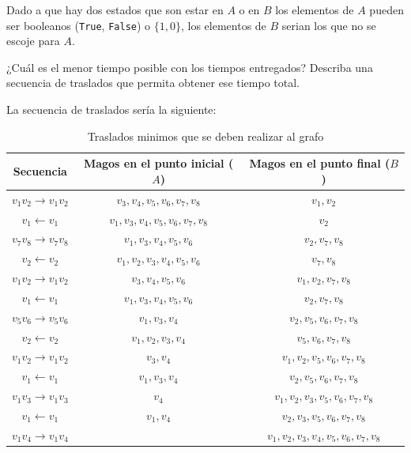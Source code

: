 \documentclass[letterpaper,10pt,table, dvipsnames]{article}
\begin{document}
Dado a que hay dos estados que son estar en $A$ o en $B$ los elementos de $A$ pueden ser booleanos (\texttt{True}, \texttt{False}) o $\{1,0\}$, los elementos de $B$ serian los que no se escoje para $A$.

\newpage

\begin{tcolorbox}
 ¿Cuál es el menor tiempo posible con los tiempos entregados? Describa una secuencia de traslados que permita obtener ese tiempo total.
\end{tcolorbox}

La secuencia de traslados sería la siguiente: 

\begin{table}[htbp]
  \centering
  \caption{Traslados minimos que se deben realizar al grafo}
\begin{tabular}{|c||c||c|}\hline
Secuencia & Magos en el punto inicial ($A$) & Magos en el punto final ($B$) \\\hline 
    $v_1v_2 \rightarrow v_1v_2$ & $v_3,v_4,v_5,v_6,v_7,v_8$     & $v_1,v_2$ \\\hline
  $  v_1 \leftarrow v_1$        & $v_1,v_3,v_4,v_5,v_6,v_7,v_8$ & $v_2$ \\\hline
    $v_7v_8 \rightarrow v_7v_8$ & $v_1,v_3,v_4,v_5,v_6$         & $v_2,v_7,v_8$ \\\hline
  $  v_2 \leftarrow v_2 $       & $v_1,v_2,v_3,v_4,v_5,v_6$     & $v_7,v_8$ \\\hline
    $v_1v_2 \rightarrow v_1v_2$ & $v_3,v_4,v_5,v_6$             & $v_1,v_2,v_7,v_8$ \\\hline
  $  v_1 \leftarrow v_1 $       & $v_1,v_3,v_4,v_5,v_6$         & $v_2,v_7,v_8$ \\\hline
    $v_5v_6 \rightarrow v_5v_6$ & $v_1,v_3,v_4$                 & $v_2,v_5,v_6,v_7,v_8$ \\\hline
  $  v_2 \leftarrow v_2 $       & $v_1,v_2,v_3,v_4$             & $v_5,v_6,v_7,v_8$ \\\hline
    $v_1v_2 \rightarrow v_1v_2$ & $v_3,v_4$                     & $v_1,v_2,v_5,v_6,v_7,v_8$ \\\hline
  $  v_1 \leftarrow v_1 $       & $v_1,v_3,v_4$                 & $v_2,v_5,v_6,v_7,v_8$ \\\hline
    $v_1v_3 \rightarrow v_1v_3$ & $v_4$                         & $v_1,v_2,v_3,v_5,v_6,v_7,v_8$ \\\hline
  $  v_1 \leftarrow v_1 $       & $v_1,v_4$                     & $v_2,v_3,v_5,v_6,v_7,v_8$ \\\hline
    $v_1v_4 \rightarrow v_1v_4$ &                               & $v_1,v_2,v_3,v_4,v_5,v_6,v_7,v_8$ \\\hline
\end{tabular}
\label{tab:minimo}
\end{table}
\end{document}
